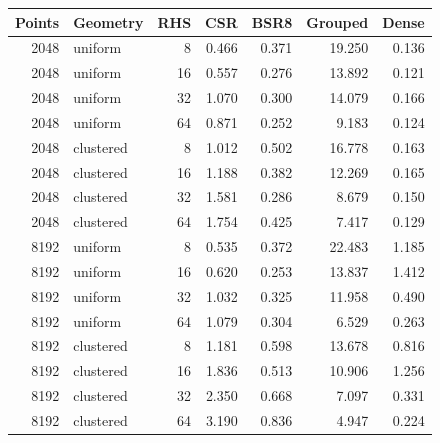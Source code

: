 \begin{tabular}{rlrrrrr}
\toprule
Points & Geometry & RHS & CSR & BSR8 & Grouped & Dense \\
\midrule
2048 & uniform & 8 & 0.466 & 0.371 & 19.250 & 0.136 \\
2048 & uniform & 16 & 0.557 & 0.276 & 13.892 & 0.121 \\
2048 & uniform & 32 & 1.070 & 0.300 & 14.079 & 0.166 \\
2048 & uniform & 64 & 0.871 & 0.252 & 9.183 & 0.124 \\
2048 & clustered & 8 & 1.012 & 0.502 & 16.778 & 0.163 \\
2048 & clustered & 16 & 1.188 & 0.382 & 12.269 & 0.165 \\
2048 & clustered & 32 & 1.581 & 0.286 & 8.679 & 0.150 \\
2048 & clustered & 64 & 1.754 & 0.425 & 7.417 & 0.129 \\
8192 & uniform & 8 & 0.535 & 0.372 & 22.483 & 1.185 \\
8192 & uniform & 16 & 0.620 & 0.253 & 13.837 & 1.412 \\
8192 & uniform & 32 & 1.032 & 0.325 & 11.958 & 0.490 \\
8192 & uniform & 64 & 1.079 & 0.304 & 6.529 & 0.263 \\
8192 & clustered & 8 & 1.181 & 0.598 & 13.678 & 0.816 \\
8192 & clustered & 16 & 1.836 & 0.513 & 10.906 & 1.256 \\
8192 & clustered & 32 & 2.350 & 0.668 & 7.097 & 0.331 \\
8192 & clustered & 64 & 3.190 & 0.836 & 4.947 & 0.224 \\
\bottomrule
\end{tabular}
